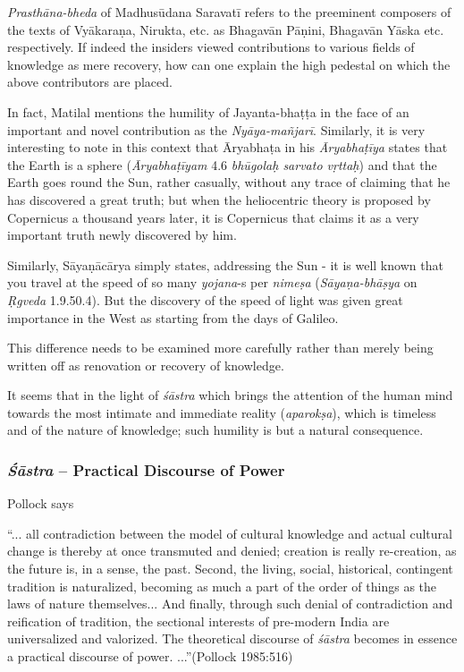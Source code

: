 \newpage

{\sl Prasthāna-bheda} of Madhusūdana Saravatī refers to the preeminent composers of the texts of Vyākaraṇa, Nirukta, etc. as Bhagavān Pāṇini, Bhagavān Yāska etc. respectively. If indeed the insiders viewed contributions to various ﬁelds of knowledge as mere recovery, how can one explain the high pedestal on which the above contributors are placed. 

In fact, Matilal mentions the humility of Jayanta-bhaṭṭa in the face of an important and novel contribution as the {\sl Nyāya-mañjarī}. Similarly, it is very interesting to note in this context that Āryabhaṭa in his  {\sl Āryabhaṭīya} states that the Earth is a sphere ({\sl Āryabhaṭīyam} 4.6 {\sl bhūgolaḥ sarvato vṛttaḥ}) and that the Earth goes round the Sun, rather casually, without any trace of claiming that he has discovered a great truth; but when the heliocentric theory is proposed by Copernicus a thousand years later, it is Copernicus that claims it as a very important truth newly discovered by him. 

Similarly, Sāyaṇācārya simply states, addressing the Sun - it is well known that you travel at the speed of so many {\sl yojana}-s per {\sl nimeṣa} ({\sl Sāyaṇa-bhāṣya} on {\sl Ṛgveda} 1.9.50.4). But the discovery of  the speed of light was given great importance in the West as starting from the days of Galileo. 

This difference needs to be examined more carefully rather than merely being written off as renovation or recovery of knowledge. 

It seems that in the light of {\sl śāstra} which brings the attention of the human mind towards the most intimate and immediate reality ({\sl aparokṣa}), which is timeless and of the nature of knowledge; such humility is but a natural consequence.\\[-25pt]

\subsubsection{{{\sl\bfseries Śāstra}\relax} -- Practical Discourse of Power}\label{art12-sec3.8.3}

Pollock  says
\begin{myquote}
``... all contradiction between the model of cultural knowledge and actual cultural change is thereby at once transmuted and denied; creation is really re-creation, as the  future is, in a sense, the past. Second, the living, social, historical, contingent tradition is naturalized, becoming as much a part of the order of things as the laws of nature  themselves... And ﬁnally, through such denial of contradiction and reiﬁcation of tradition, the sectional interests of pre-modern India are universalized and valorized. The theoretical discourse of {\sl śāstra} becomes in essence a practical discourse of power. ...''\hfill (Pollock 1985:516)
\end{myquote}

